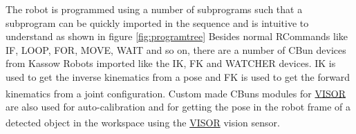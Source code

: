 The robot is programmed using a number of subprograms such that a subprogram
can be quickly imported in the sequence and is intuitive to understand as shown in figure \ref{fig:programtree}
Besides normal RCommands like IF, LOOP, FOR, MOVE, WAIT and so on, there are a number of CBun devices
from Kassow Robots
imported like the IK, FK and WATCHER devices. IK is used to get the inverse
kinematics from a pose and FK is used to get the forward kinematics
from a joint configuration.
Custom made CBuns modules for \hyperref[acro:VISOR]{VISOR}\textsuperscript{\textregistered}
are also used for auto-calibration and for getting the pose in the
robot frame of a detected object in the workspace using the \hyperref[acro:VISOR]{VISOR}\textsuperscript{\textregistered} vision sensor.

